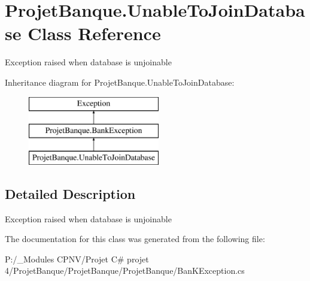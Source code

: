 \hypertarget{class_projet_banque_1_1_unable_to_join_database}{}\section{Projet\+Banque.\+Unable\+To\+Join\+Database Class Reference}
\label{class_projet_banque_1_1_unable_to_join_database}


Exception raised when database is unjoinable  


Inheritance diagram for Projet\+Banque.\+Unable\+To\+Join\+Database\+:\begin{figure}[H]
\begin{center}
\leavevmode
\includegraphics[height=3.000000cm]{class_projet_banque_1_1_unable_to_join_database}
\end{center}
\end{figure}


\subsection{Detailed Description}
Exception raised when database is unjoinable 



The documentation for this class was generated from the following file\+:\begin{DoxyCompactItemize}
\item 
P\+:/\+\_\+\+Modules C\+P\+N\+V/\+Projet C\# projet 4/\+Projet\+Banque/\+Projet\+Banque/\+Projet\+Banque/Ban\+K\+Exception.\+cs\end{DoxyCompactItemize}

